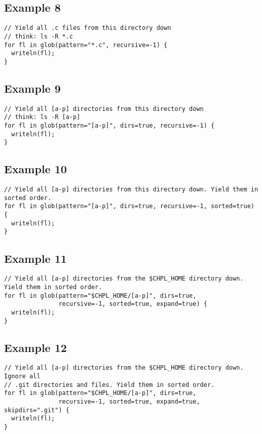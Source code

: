 \documentclass{article}
\begin{document}
\subsection{Example 8}
\begin{lstlisting}
// Yield all .c files from this directory down
// think: ls -R *.c
for fl in glob(pattern="*.c", recursive=-1) {
  writeln(fl);
}
\end{lstlisting}

\subsection{Example 9}
\begin{lstlisting}
// Yield all [a-p] directories from this directory down
// think: ls -R [a-p]
for fl in glob(pattern="[a-p]", dirs=true, recursive=-1) {
  writeln(fl);
}
\end{lstlisting}

\subsection{Example 10}
\begin{lstlisting}
// Yield all [a-p] directories from this directory down. Yield them in sorted order.
for fl in glob(pattern="[a-p]", dirs=true, recursive=-1, sorted=true) {
  writeln(fl);
}
\end{lstlisting}

\subsection{Example 11}
\begin{lstlisting}
// Yield all [a-p] directories from the $CHPL_HOME directory down. Yield them in sorted order.
for fl in glob(pattern="$CHPL_HOME/[a-p]", dirs=true,
               recursive=-1, sorted=true, expand=true) {
  writeln(fl);
}
\end{lstlisting}

\subsection{Example 12}
\begin{lstlisting}
// Yield all [a-p] directories from the $CHPL_HOME directory down. Ignore all
// .git directories and files. Yield them in sorted order.
for fl in glob(pattern="$CHPL_HOME/[a-p]", dirs=true,
               recursive=-1, sorted=true, expand=true, skipdirs=".git") {
  writeln(fl);
}
\end{lstlisting}

\end{document}

